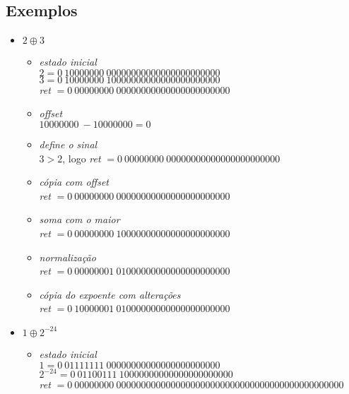 \documentclass{article}
\begin{document}
\subsection*{Exemplos}
\begin{itemize}
\item $2 \oplus 3$
    \begin{itemize}
        
    \item \textit{estado inicial} \\    
    $2 = {0}\ {10000000}\ {00000000000000000000000}$ \\
    $3 = {0}\ {10000000}\ {10000000000000000000000}$ \\
    \textit{ret} $= {0}\ {00000000}\ {00000000000000000000000}$ \\

    \item \textit{offset} \\
    ${10000000}\ - {10000000} = 0$
    
    \item \textit{define o sinal} \\
    $ 3 > 2$, logo \textit{ret} $= {0}\ {00000000}\ {00000000000000000000000}$
      
    \item \textit{cópia com offset} \\
    \textit{ret} $= {0}\ {00000000}\ {00000000000000000000000}$
      
    \item \textit{soma com o maior} \\
    \textit{ret} $= {0}\ {00000000}\ {10000000000000000000000}$

    \item \textit{normalização} \\
    \textit{ret} $= {0}\ {00000001}\ {01000000000000000000000}$
    
    \item \textit{cópia do expoente com alterações} \\
    \textit{ret} $= {0}\ {10000001}\ {01000000000000000000000}$
    \end{itemize}

\item $1 \oplus 2^{-24} $ 
    \begin{itemize}
        
    \item \textit{estado inicial} \\    
    $1 = {0}\ {01111111}\ {00000000000000000000000}$ \\
    $2^{-24} = {0}\ {01100111}\ {10000000000000000000000}$ \\
    \textit{ret} $= {0}\ {00000000}\ {0000000000000000000000000000000000000000000000}$ \\


\end{itemize}
\end{itemize}
\end{document}

